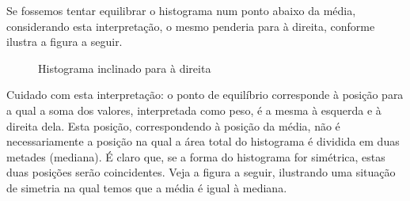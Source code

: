 Se fossemos tentar equilibrar o histograma num ponto abaixo da média, considerando esta interpretação, o mesmo penderia para à direita, conforme ilustra a figura a seguir.

\begin{figure}[H]
\centering
\capstart

\caption{Histograma inclinado para à direita}\label{\detokenize{PE104-1:id3}}\label{\detokenize{PE104-1:id10}}
\end{figure}

Cuidado com esta interpretação: o ponto de equilíbrio corresponde à posição para a qual a soma dos valores, interpretada como peso, é a mesma à esquerda e à direita dela. Esta posição, correspondendo à posição da média, não é necessariamente a posição na qual a área total do histograma é dividida em duas metades (mediana). É claro que, se a forma do histograma for simétrica, estas duas posições serão coincidentes. Veja a figura a seguir, ilustrando uma situação de simetria na qual temos que a média é igual à mediana.

